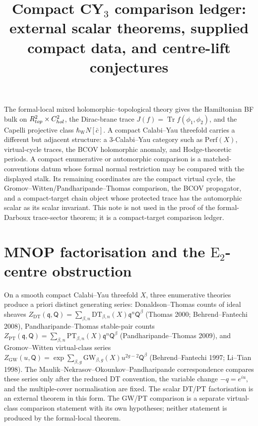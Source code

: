 \documentclass[12pt]{amsart}
\title[Compact CY$_3$ comparison ledger]{Compact CY$_3$ comparison ledger:
  external scalar theorems, supplied compact data, and centre-lift
  conjectures}
\theoremstyle{remark}
\providecommand{\E}{\mathrm{E}}
\providecommand{\DT}{\mathrm{DT}}
\providecommand{\PT}{\mathrm{PT}}
\providecommand{\GW}{\mathrm{GW}}
\providecommand{\Perf}{\mathrm{Perf}}
\begin{document}
\maketitle

The formal-local mixed holomorphic--topological theory gives the
Hamiltonian BF bulk on
\(R^2_{top}\times C^2_{hol}\), the
Dirac-brane trace \(J(f)=\operatorname{Tr}f(\phi_1,\phi_2)\), and the
Capelli projective class \(\hbar_{\mathrm{W}} N[\bar c]\).  A compact
Calabi--Yau threefold carries a different but adjacent structure: a
3-Calabi--Yau category such as \(\Perf(X)\), virtual-cycle traces, the
BCOV holomorphic anomaly, and Hodge-theoretic periods.  A compact
enumerative or automorphic comparison is a matched-conventions datum
whose formal normal restriction may be compared with the displayed
stalk.  Its remaining coordinates are the compact virtual cycle, the
Gromov--Witten/Pandharipande--Thomas comparison, the BCOV propagator,
and a compact-target chain object whose protected trace has the
automorphic scalar as its scalar invariant.  This note is not used in the proof of
the formal-Darboux trace-sector theorem; it is a compact-target
comparison ledger.

\section{\texorpdfstring{MNOP factorisation and the $\E_2$-centre obstruction}{MNOP factorisation and the E2-centre obstruction}}\label{sec:mnop}

On a smooth compact Calabi--Yau threefold \(X\), three enumerative
theories produce a priori distinct generating series: Donaldson--Thomas
counts of ideal sheaves
\(Z_{\DT}(\mathfrak q,\mathsf Q)=
\sum_{\beta,n}\DT_{\beta,n}(X)\mathfrak q^n\mathsf Q^\beta\)
(Thomas 2000;
Behrend--Fantechi 2008), Pandharipande--Thomas stable-pair counts
\(Z_{\PT}(\mathfrak q,\mathsf Q)=
\sum_{\beta,n}\PT_{\beta,n}(X)\mathfrak q^n\mathsf Q^\beta\)
(Pandharipande--Thomas 2009), and
Gromov--Witten virtual-class series
\(Z_{\GW}(u,\mathsf Q)=
\exp\sum_{\beta,g}\GW_{\beta,g}(X)u^{2g-2}\mathsf Q^\beta\)
(Behrend--Fantechi 1997;
Li--Tian 1998).  The Maulik--Nekrasov--Okounkov--Pandharipande correspondence
compares these series only after the reduced DT convention, the
variable change \(-q=e^{iu}\), and the multiple-cover normalisation are
fixed.  The scalar DT/PT factorisation is an external theorem in this
form.  The GW/PT comparison is a separate virtual-class comparison
statement with its own hypotheses; neither statement is produced by the
formal-local theorem.
\end{document}
